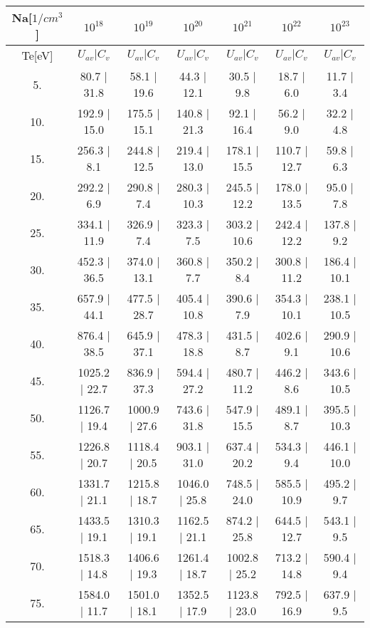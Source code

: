 \begin{tabular}{|c||c|c|c|c|c|c|}
\hline
Na[$1/cm^3$] & $10^{18}$ & $10^{19}$ & $10^{20}$ & $10^{21}$ & $10^{22}$ & $10^{23}$\tabularnewline
\hline
Te[eV] & $U_{av} | C_v$ & $U_{av} | C_v$ & $U_{av} | C_v$ & $U_{av} | C_v$ & $U_{av} | C_v$ & $U_{av} | C_v$\tabularnewline
\hline
\hline
   5. &     80.7 |    31.8 &     58.1 |    19.6 &     44.3 |    12.1 &     30.5 |     9.8 &     18.7 |     6.0 &     11.7 |     3.4\tabularnewline
\hline
  10. &    192.9 |    15.0 &    175.5 |    15.1 &    140.8 |    21.3 &     92.1 |    16.4 &     56.2 |     9.0 &     32.2 |     4.8\tabularnewline
\hline
  15. &    256.3 |     8.1 &    244.8 |    12.5 &    219.4 |    13.0 &    178.1 |    15.5 &    110.7 |    12.7 &     59.8 |     6.3\tabularnewline
\hline
  20. &    292.2 |     6.9 &    290.8 |     7.4 &    280.3 |    10.3 &    245.5 |    12.2 &    178.0 |    13.5 &     95.0 |     7.8\tabularnewline
\hline
  25. &    334.1 |    11.9 &    326.9 |     7.4 &    323.3 |     7.5 &    303.2 |    10.6 &    242.4 |    12.2 &    137.8 |     9.2\tabularnewline
\hline
  30. &    452.3 |    36.5 &    374.0 |    13.1 &    360.8 |     7.7 &    350.2 |     8.4 &    300.8 |    11.2 &    186.4 |    10.1\tabularnewline
\hline
  35. &    657.9 |    44.1 &    477.5 |    28.7 &    405.4 |    10.8 &    390.6 |     7.9 &    354.3 |    10.1 &    238.1 |    10.5\tabularnewline
\hline
  40. &    876.4 |    38.5 &    645.9 |    37.1 &    478.3 |    18.8 &    431.5 |     8.7 &    402.6 |     9.1 &    290.9 |    10.6\tabularnewline
\hline
  45. &   1025.2 |    22.7 &    836.9 |    37.3 &    594.4 |    27.2 &    480.7 |    11.2 &    446.2 |     8.6 &    343.6 |    10.5\tabularnewline
\hline
  50. &   1126.7 |    19.4 &   1000.9 |    27.6 &    743.6 |    31.8 &    547.9 |    15.5 &    489.1 |     8.7 &    395.5 |    10.3\tabularnewline
\hline
  55. &   1226.8 |    20.7 &   1118.4 |    20.5 &    903.1 |    31.0 &    637.4 |    20.2 &    534.3 |     9.4 &    446.1 |    10.0\tabularnewline
\hline
  60. &   1331.7 |    21.1 &   1215.8 |    18.7 &   1046.0 |    25.8 &    748.5 |    24.0 &    585.5 |    10.9 &    495.2 |     9.7\tabularnewline
\hline
  65. &   1433.5 |    19.1 &   1310.3 |    19.1 &   1162.5 |    21.1 &    874.2 |    25.8 &    644.5 |    12.7 &    543.1 |     9.5\tabularnewline
\hline
  70. &   1518.3 |    14.8 &   1406.6 |    19.3 &   1261.4 |    18.7 &   1002.8 |    25.2 &    713.2 |    14.8 &    590.4 |     9.4\tabularnewline
\hline
  75. &   1584.0 |    11.7 &   1501.0 |    18.1 &   1352.5 |    17.9 &   1123.8 |    23.0 &    792.5 |    16.9 &    637.9 |     9.5\tabularnewline

\end{tabular}
